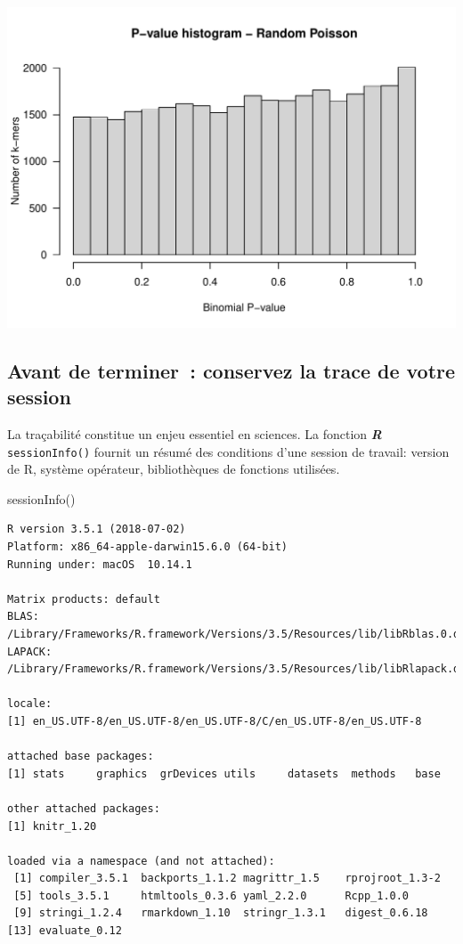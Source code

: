 \documentclass[]{article}
\newenvironment{Shaded}{\begin{snugshade}}{\end{snugshade}}
\newcommand{\KeywordTok}[1]{\textcolor[rgb]{0.94,0.87,0.69}{#1}}
\newcommand{\NormalTok}[1]{\textcolor[rgb]{0.80,0.80,0.80}{#1}}
\begin{document}
\begin{center}\includegraphics{figures/multiple_tests_practical_pval_hist_rand-occ-1} \end{center}

\subsection{Avant de terminer~: conservez la trace de votre
session}\label{avant-de-terminer-conservez-la-trace-de-votre-session}

La traçabilité constitue un enjeu essentiel en sciences. La fonction
\textbf{\emph{R}} \texttt{sessionInfo()} fournit un résumé des
conditions d'une session de travail: version de R, système opérateur,
bibliothèques de fonctions utilisées.

\begin{Shaded}
\begin{Highlighting}[]
\KeywordTok{sessionInfo}\NormalTok{()}
\end{Highlighting}
\end{Shaded}

\begin{verbatim}
R version 3.5.1 (2018-07-02)
Platform: x86_64-apple-darwin15.6.0 (64-bit)
Running under: macOS  10.14.1

Matrix products: default
BLAS: /Library/Frameworks/R.framework/Versions/3.5/Resources/lib/libRblas.0.dylib
LAPACK: /Library/Frameworks/R.framework/Versions/3.5/Resources/lib/libRlapack.dylib

locale:
[1] en_US.UTF-8/en_US.UTF-8/en_US.UTF-8/C/en_US.UTF-8/en_US.UTF-8

attached base packages:
[1] stats     graphics  grDevices utils     datasets  methods   base     

other attached packages:
[1] knitr_1.20

loaded via a namespace (and not attached):
 [1] compiler_3.5.1  backports_1.1.2 magrittr_1.5    rprojroot_1.3-2
 [5] tools_3.5.1     htmltools_0.3.6 yaml_2.2.0      Rcpp_1.0.0     
 [9] stringi_1.2.4   rmarkdown_1.10  stringr_1.3.1   digest_0.6.18  
[13] evaluate_0.12  
\end{verbatim}
\end{document}
